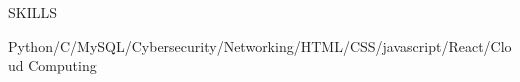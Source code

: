 \documentclass{resume}
\begin{document}
\vspace{-0.2em}
\begin{rSection}{SKILLS}
    
        Python/C/MySQL/Cybersecurity/Networking/HTML/CSS/javascript/React/Cloud Computing
\end{rSection}
\vspace{-0.6em}
\end{document}
